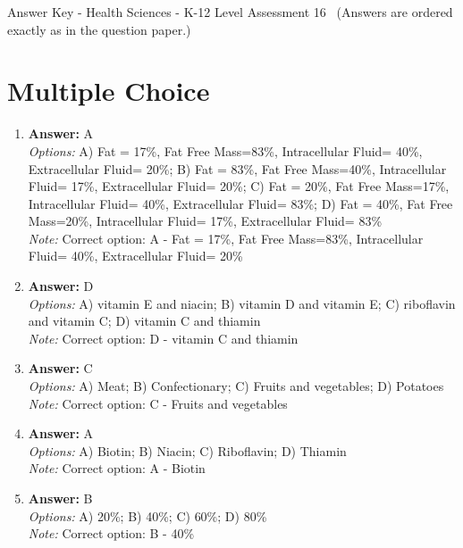 \documentclass[12pt]{article}
\begin{document}
\begin{center}
Answer Key - Health Sciences - K-12 Level Assessment 16 \
\small (Answers are ordered exactly as in the question paper.)
\end{center}

\section*{Multiple Choice}
\begin{enumerate}[label=\arabic*.]
\item \textbf{Answer:} A
\\ \textit{Options:} A) Fat = 17\%, Fat Free Mass=83\%, Intracellular Fluid= 40\%, Extracellular Fluid= 20\%; B) Fat = 83\%, Fat Free Mass=40\%, Intracellular Fluid= 17\%, Extracellular Fluid= 20\%; C) Fat = 20\%, Fat Free Mass=17\%, Intracellular Fluid= 40\%, Extracellular Fluid= 83\%; D) Fat = 40\%, Fat Free Mass=20\%, Intracellular Fluid= 17\%, Extracellular Fluid= 83\%
\\ \textit{Note:} Correct option: A - Fat = 17\%, Fat Free Mass=83\%, Intracellular Fluid= 40\%, Extracellular Fluid= 20\%
\item \textbf{Answer:} D
\\ \textit{Options:} A) vitamin E and niacin; B) vitamin D and vitamin E; C) riboflavin and vitamin C; D) vitamin C and thiamin
\\ \textit{Note:} Correct option: D - vitamin C and thiamin
\item \textbf{Answer:} C
\\ \textit{Options:} A) Meat; B) Confectionary; C) Fruits and vegetables; D) Potatoes
\\ \textit{Note:} Correct option: C - Fruits and vegetables
\item \textbf{Answer:} A
\\ \textit{Options:} A) Biotin; B) Niacin; C) Riboflavin; D) Thiamin
\\ \textit{Note:} Correct option: A - Biotin
\item \textbf{Answer:} B
\\ \textit{Options:} A) 20\%; B) 40\%; C) 60\%; D) 80\%
\\ \textit{Note:} Correct option: B - 40\%
\end{enumerate}
\end{document}
